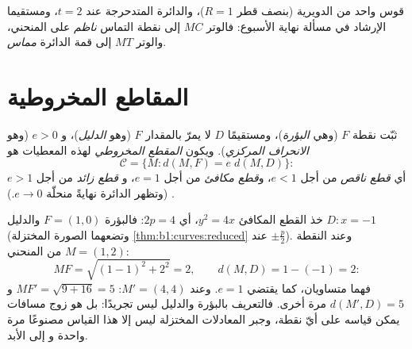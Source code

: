 \begin{omfigure}

{\small قوس واحد من الدويرية (بنصف قطر $R = 1$)، والدائرة
المتدحرجة عند $t = 2$، ومستقيما الإرشاد في مسألة نهاية الأسبوع:
فالوتر $MC$ إلى نقطة التماس \emph{ناظم} على
المنحني، والوتر $MT$ إلى قمة الدائرة \emph{مماس}.}
\end{omfigure}

\section{المقاطع المخروطية}

\begin{definition}\label{def:b1:curves:conics}
ثبّت نقطة $F$ (وهي \emph{البؤرة})، ومستقيمًا $D$ لا يمرّ بالمقدار $F$
(وهو \emph{الدليل})، و $e > 0$ (وهو \emph{الانحراف المركزي}). ويكون
\emph{المقطع المخروطي} لهذه المعطيات هو
\[
\mathcal{C} = \{M : d(M, F) = e\; d(M, D)\}:
\]
أي \emph{قطع ناقص} من أجل $e < 1$، و\emph{قطع مكافئ} من أجل $e = 1$، و
\emph{قطع زائد} من أجل $e > 1$. (وتظهر الدائرة نهايةً منحلّة
$e \to 0$.)
\end{definition}

\begin{example}
\label{ex:b1:curves:parabolacheck}
خذ القطع المكافئ $y^2 = 4x$، أي $2p = 4$: فالبؤرة $F = (1, 0)$
والدليل $D : x = -1$ (وتضعهما الصورة المختزلة
\cref{thm:b1:curves:reduced} عند $\pm\frac p2$). وعند
النقطة $M = (1, 2)$ من المنحني:
\[
MF = \sqrt{(1-1)^2 + 2^2} = 2,
\qquad
d(M, D) = 1 - (-1) = 2 :
\]
فهما متساويان، كما يقتضي $e = 1$. وعند $M' = (4, 4)$: $MF' = \sqrt{9 +
16} = 5$ و $d(M', D) = 5$ مرة أخرى. فالتعريف بالبؤرة والدليل
ليس تجريدًا: بل هو زوج مسافات يمكن
قياسه على أيّ نقطة، وجبر المعادلات
المختزلة ليس إلا هذا القياس مصنوعًا مرة واحدة و
إلى الأبد.
\end{example}

